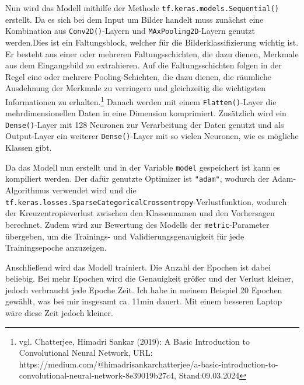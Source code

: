 \documentclass[11pt,oneside]{report}
\begin{document}
Nun wird das Modell mithilfe der Methode \verb+tf.keras.models.Sequential()+ erstellt. Da es sich bei dem Input um Bilder handelt muss zunächst eine Kombination aus \verb+Conv2D()+-Layern und \verb+MAxPooling2D+-Layern genutzt werden.Dies ist ein Faltungsblock, welcher für die Bilderklassifizierung wichtig ist. Er besteht aus einer oder mehreren Faltungsschichten, die dazu dienen, Merkmale aus dem Eingangsbild zu extrahieren. Auf die Faltungsschichten folgen in der Regel eine oder mehrere Pooling-Schichten, die dazu dienen, die räumliche Ausdehnung der Merkmale zu verringern und gleichzeitig die wichtigsten Informationen zu erhalten.\footnote{vgl. Chatterjee, Himadri Sankar (2019): A Basic Introduction to Convolutional Neural Network, URL: https://medium.com/@himadrisankarchatterjee/a-basic-introduction-to-convolutional-neural-network-8e39019b27c4, Stand:09.03.2024} Danach werden mit einem \verb+Flatten()+-Layer die mehrdimensionellen Daten in eine Dimension komprimiert. Zusätzlich wird ein \verb+Dense()+-Layer mit 128 Neuronen zur Verarbeitung der Daten genutzt und als Output-Layer ein weiterer \verb+Dense()+-Layer mit so vielen Neuronen, wie es mögliche Klassen gibt.

Da das Modell nun erstellt und in der Variable \verb+model+ gespeichert ist kann es kompiliert werden. Der dafür genutzte Optimizer ist \verb+"adam"+, wodurch der Adam-Algorithmus verwendet wird und die \verb+tf.keras.losses.SparseCategoricalCrossentropy+-Verlustfunktion, wodurch der Kreuzentropieverlust zwischen den Klassennamen und den Vorhersagen berechnet. Zudem wird zur Bewertung des Modells der \verb+metric+-Parameter übergeben, um die Trainings- und Validierungsgenauigkeit für jede Trainingsepoche anzuzeigen.

Anschließend wird das Modell trainiert. Die Anzahl der Epochen ist dabei beliebig. Bei mehr Epochen wird die Genauigkeit größer und der Verlust kleiner, jedoch verbraucht jede Epoche Zeit. Ich habe in meinem Beispiel 20 Epochen gewählt, was bei mir insgesamt ca. 11min dauert. Mit einem besseren Laptop wäre diese Zeit jedoch kleiner.
\end{document}
